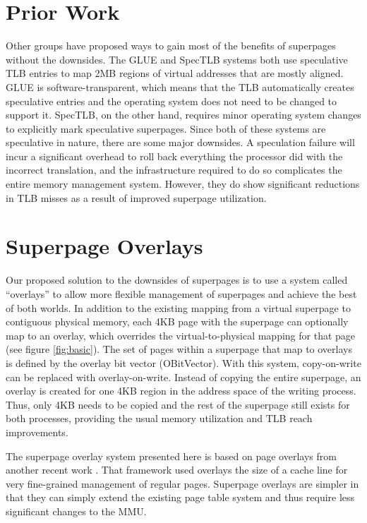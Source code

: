 \section{Prior Work}

Other groups have proposed ways to gain most of the benefits of superpages without the downsides. The GLUE \cite{Pham} and SpecTLB \cite{Barr} systems both use speculative TLB entries to map 2MB regions of virtual addresses that are mostly aligned. GLUE is software-transparent, which means that the TLB automatically creates speculative entries and the operating system does not need to be changed to support it. SpecTLB, on the other hand, requires minor operating system changes to explicitly mark speculative superpages. Since both of these systems are speculative in nature, there are some major downsides. A speculation failure will incur a significant overhead to roll back everything the processor did with the incorrect translation, and the infrastructure required to do so complicates the entire memory management system. However, they do show significant reductions in TLB misses as a result of improved superpage utilization.

\section{Superpage Overlays}

Our proposed solution to the downsides of superpages is to use a system called ``overlays'' to allow more flexible management of superpages and achieve the best of both worlds. In addition to the existing mapping from a virtual superpage to contiguous physical memory, each 4KB page with the superpage can optionally map to an overlay, which overrides the virtual-to-physical mapping for that page (see figure \ref{fig:basic}). The set of pages within a superpage that map to overlays is defined by the overlay bit vector (OBitVector). With this system, copy-on-write can be replaced with overlay-on-write. Instead of copying the entire superpage, an overlay is created for one 4KB region in the address space of the writing process. Thus, only 4KB needs to be copied and the rest of the superpage still exists for both processes, providing the usual memory utilization and TLB reach improvements.

The superpage overlay system presented here is based on page overlays from another recent work \cite{Seshadri}. That framework used overlays the size of a cache line for very fine-grained management of regular pages. Superpage overlays are simpler in that they can simply extend the existing page table system and thus require less significant changes to the MMU.

